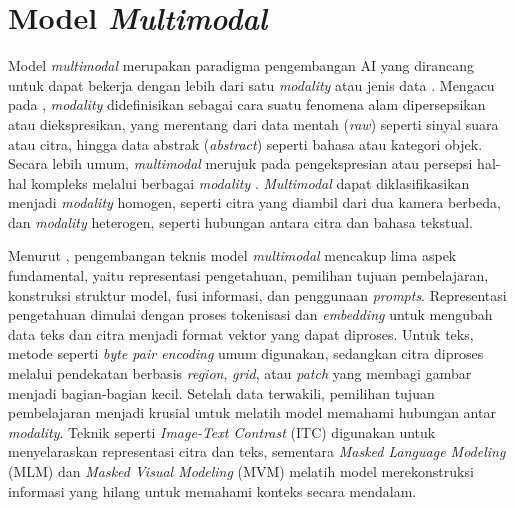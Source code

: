 \section{Model \textit{Multimodal}}
Model \textit{multimodal} merupakan paradigma pengembangan AI yang dirancang untuk dapat bekerja dengan lebih dari satu \textit{modality} atau jenis data \parencite{huyenAIEngineeringBuilding2025}. Mengacu pada \textcite{liangFoundationsTrendsMultimodal2023}, \textit{modality} didefinisikan sebagai cara suatu fenomena alam dipersepsikan atau diekspresikan, yang merentang dari data mentah (\textit{raw}) seperti sinyal suara atau citra, hingga data abstrak (\textit{abstract}) seperti bahasa atau kategori objek. Secara lebih umum, \textit{multimodal} merujuk pada pengekspresian atau persepsi hal-hal kompleks melalui berbagai \textit{modality} \parencite{10386743}. \textit{Multimodal} dapat diklasifikasikan menjadi \textit{modality} homogen, seperti citra yang diambil dari dua kamera berbeda, dan \textit{modality} heterogen, seperti hubungan antara citra dan bahasa tekstual. 

Menurut \textcite{wuMultimodalLargeLanguage2023}, pengembangan teknis model \textit{multimodal} mencakup lima aspek fundamental, yaitu representasi pengetahuan, pemilihan tujuan pembelajaran, konstruksi struktur model, fusi informasi, dan penggunaan \textit{prompts}. Representasi pengetahuan dimulai dengan proses tokenisasi dan \textit{embedding} untuk mengubah data teks dan citra menjadi format vektor yang dapat diproses. Untuk teks, metode seperti \textit{byte pair encoding} umum digunakan, sedangkan citra diproses melalui pendekatan berbasis \textit{region}, \textit{grid}, atau \textit{patch} yang membagi gambar menjadi bagian-bagian kecil. Setelah data terwakili, pemilihan tujuan pembelajaran menjadi krusial untuk melatih model memahami hubungan antar \textit{modality}. Teknik seperti \textit{Image-Text Contrast} (ITC) digunakan untuk menyelaraskan representasi citra dan teks, sementara \textit{Masked Language Modeling} (MLM) dan \textit{Masked Visual Modeling} (MVM) melatih model merekonstruksi informasi yang hilang untuk memahami konteks secara mendalam.

